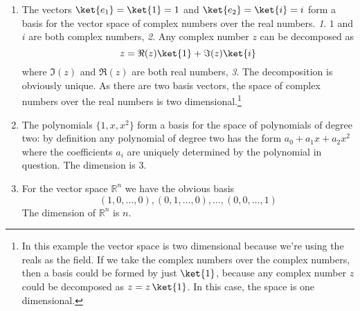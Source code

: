 \begin{enumerate}
\item The vectors $\ket{e_1} = \ket{1} = 1$ and $\ket{e_2} = \ket{i} = i$ form a basis for the vector space of complex numbers over the real numbers.
\emph{1}. $1$ and $i$ are both complex numbers, \emph{2}. Any complex number $z$ can be decomposed as
\begin{displaymath}
z = \Re(z) \ket{1} + \Im(z) \ket{i}
\end{displaymath}
where $\Im(z)$ and $\Re(z)$ are both real numbers, \emph{3}. The decomposition is obviously unique.
As there are two basis vectors, the space of complex numbers over the real numbers is two dimensional.\footnote{In this example the vector space is two dimensional because we're using the reals as the field.
If we take the complex numbers over the complex numbers, then a basis could be formed by just $\ket{1}$, because any complex number $z$ could be decomposed as $z = z\,\ket{1}$.
In this case, the space is one dimensional.}
\item The polynomials $\{1, x,x^{2}\}$ form a basis for the space of polynomials of degree two: by definition any polynomial of degree two has the form $a_0 + a_1 x + a_2 x^2$ where the coefficients $a_i$ are uniquely determined by the polynomial in question.
The dimension is 3.
\item For the vector space $\mathbb{R}^n$ we have the obvious basis
\begin{displaymath}
(1,0,\ldots ,0), (0,1,\ldots ,0), \ldots , (0,0,\ldots ,1)
\end{displaymath}
The dimension of $\mathbb{R}^n$ is $n$.
\end{enumerate}

